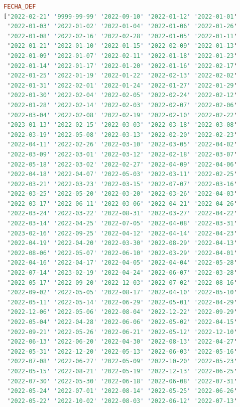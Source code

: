 \begin{lstlisting}[language=haskell, caption=Valores por columna, captionpos=b, label=lst:fiboHaskell]
FECHA_DEF
['2022-02-21' '9999-99-99' '2022-09-10' '2022-01-12' '2022-01-01'
 '2022-01-03' '2022-01-02' '2022-01-04' '2022-01-06' '2022-01-26'
 '2022-01-08' '2022-02-16' '2022-02-28' '2022-01-05' '2022-01-11'
 '2022-01-21' '2022-01-10' '2022-01-15' '2022-02-09' '2022-01-13'
 '2022-01-09' '2022-01-07' '2022-02-11' '2022-01-18' '2022-01-23'
 '2022-01-14' '2022-01-17' '2022-01-20' '2022-01-16' '2022-02-17'
 '2022-01-25' '2022-01-19' '2022-01-22' '2022-02-13' '2022-02-02'
 '2022-01-31' '2022-02-01' '2022-01-24' '2022-01-27' '2022-01-29'
 '2022-01-30' '2022-02-04' '2022-02-05' '2022-02-24' '2022-02-12'
 '2022-01-28' '2022-02-14' '2022-02-03' '2022-02-07' '2022-02-06'
 '2022-03-04' '2022-02-08' '2022-02-19' '2022-02-10' '2022-02-22'
 '2023-01-13' '2022-02-15' '2022-03-03' '2022-03-18' '2022-03-08'
 '2022-03-19' '2022-05-08' '2022-03-13' '2022-02-20' '2022-02-23'
 '2022-04-11' '2022-02-26' '2022-03-10' '2022-03-05' '2022-04-02'
 '2022-03-09' '2022-03-01' '2022-03-12' '2022-02-18' '2022-03-07'
 '2022-05-18' '2022-03-02' '2022-02-27' '2022-04-09' '2022-04-06'
 '2022-04-18' '2022-04-07' '2022-05-03' '2022-03-11' '2022-02-25'
 '2022-03-21' '2022-03-23' '2022-03-15' '2022-07-07' '2022-03-16'
 '2022-03-25' '2022-05-20' '2022-03-20' '2022-03-26' '2022-04-03'
 '2022-03-17' '2022-06-11' '2022-03-06' '2022-04-21' '2022-04-26'
 '2022-03-24' '2022-03-22' '2022-08-31' '2022-03-27' '2022-04-22'
 '2022-03-14' '2022-04-25' '2022-07-05' '2022-04-08' '2022-03-31'
 '2023-02-16' '2022-09-25' '2022-04-12' '2022-04-14' '2022-04-23'
 '2022-04-19' '2022-04-20' '2022-03-30' '2022-08-29' '2022-04-13'
 '2022-08-06' '2022-05-07' '2022-06-10' '2022-03-29' '2022-04-01'
 '2022-04-16' '2022-04-17' '2022-04-05' '2022-04-04' '2022-05-28'
 '2022-07-14' '2023-02-19' '2022-04-24' '2022-06-07' '2022-03-28'
 '2022-05-17' '2022-09-20' '2022-12-03' '2022-07-02' '2022-08-16'
 '2022-09-02' '2022-05-05' '2022-08-17' '2022-04-10' '2022-05-10'
 '2022-05-11' '2022-05-14' '2022-06-29' '2022-05-01' '2022-04-29'
 '2022-12-06' '2022-05-06' '2022-08-04' '2022-12-22' '2022-09-29'
 '2022-05-04' '2022-04-28' '2022-06-06' '2022-05-02' '2022-04-15'
 '2022-09-21' '2022-05-26' '2022-06-21' '2022-05-12' '2022-12-10'
 '2022-06-13' '2022-06-20' '2022-04-30' '2022-08-13' '2022-04-27'
 '2022-05-31' '2022-12-20' '2022-05-13' '2022-06-03' '2022-05-16'
 '2022-07-08' '2022-06-27' '2022-05-09' '2022-10-20' '2022-05-23'
 '2022-05-15' '2022-08-21' '2022-05-19' '2022-12-13' '2022-06-25'
 '2022-07-30' '2022-05-30' '2022-06-18' '2022-06-08' '2022-07-31'
 '2022-05-24' '2022-07-01' '2022-08-14' '2022-05-25' '2022-06-26'
 '2022-05-22' '2022-10-02' '2022-08-03' '2022-06-12' '2022-07-13'

\end{lstlisting}
